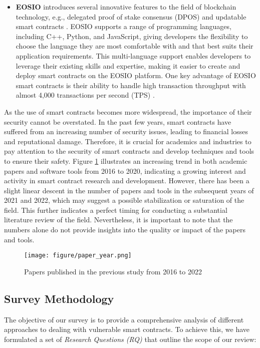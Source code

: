 \documentclass[manuscript,screen]{acmart}
\begin{document}
\begin{itemize}
  \item \textbf{EOSIO} introduces several innovative features to the field of blockchain technology, e.g., delegated proof of stake consensus (DPOS) and updatable smart contracts \cite{HeZ00L0YJ21}. EOSIO supports a range of programming languages, including C++, Python, and JavaScript, giving developers the flexibility to choose the language they are most comfortable with and that best suits their application requirements. This multi-language support enables developers to leverage their existing skills and expertise, making it easier to create and deploy smart contracts on the EOSIO platform. One key advantage of EOSIO smart contracts is their ability to handle high transaction throughput with almost 4,000 transactions per second (TPS) \cite{EOSIONetwork}.
\end{itemize}

As the use of smart contracts becomes more widespread, the importance of their security cannot be overstated. In the past few years, smart contracts have suffered from an increasing number of security issues, leading to financial losses and reputational damage. Therefore, it is crucial for academics and industries to pay attention to the security of smart contracts and develop techniques and tools to ensure their safety. Figure \ref{fig_statistics} illustrates an increasing trend in both academic papers and software tools from 2016 to 2020, indicating a growing interest and activity in smart contract research and development. However, there has been a slight linear descent in the number of papers and tools in the subsequent years of 2021 and 2022, which may suggest a possible stabilization or saturation of the field. This further indicates a perfect timing for conducting a substantial literature review of the field. Nevertheless, it is important to note that the numbers alone do not provide insights into the quality or impact of the papers and tools.

\begin{figure}[ht]
	\centering
	\texttt{[image: figure/paper\_year.png]}
	\caption{Papers published in the previous study from 2016 to 2022}
	\label{fig_statistics}
\end{figure}


\subsection{Survey Methodology}
\label{survey_methodology}
The objective of our survey is to provide a comprehensive analysis of different approaches to dealing with vulnerable smart contracts. To achieve this, we have formulated a set of \textit{Research Questions (RQ)} that outline the scope of our review:
\end{document}
